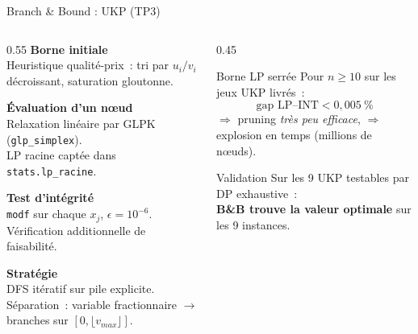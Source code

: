 \documentclass[aspectratio=169, 11pt]{beamer}
\begin{document}
\begin{frame}{Branch \& Bound : UKP (TP3)}
\begin{columns}[T]
\begin{column}{0.55\textwidth}
\textbf{Borne initiale} \\
Heuristique \alert{qualité-prix}~: tri par $u_i / v_i$ décroissant, saturation gloutonne.

\vspace{0.5em}
\textbf{Évaluation d'un nœud} \\
Relaxation linéaire par GLPK (\texttt{glp\_simplex}). \\
LP racine captée dans \texttt{stats.lp\_racine}.

\vspace{0.5em}
\textbf{Test d'intégrité} \\
\texttt{modf} sur chaque $x_j$, $\epsilon = 10^{-6}$. \\
Vérification additionnelle de faisabilité.

\vspace{0.5em}
\textbf{Stratégie} \\
DFS itératif sur pile explicite. \\
Séparation~: variable fractionnaire $\to$ branches sur $[0, \lfloor v_{max} \rfloor]$.
\end{column}
\begin{column}{0.45\textwidth}
\begin{block}{Borne LP serrée}
Pour $n \geq 10$ sur les jeux UKP livrés~:
\[
  \text{gap LP--INT} < 0{,}005~\%
\]
$\Rightarrow$ pruning \emph{très peu efficace}, $\Rightarrow$ explosion en temps (millions de nœuds).
\end{block}

\begin{exampleblock}{Validation}
Sur les 9 UKP testables par DP exhaustive~: \\
\textbf{B\&B trouve la valeur optimale} sur les 9 instances.
\end{exampleblock}
\end{column}
\end{columns}
\end{frame}
\end{document}
